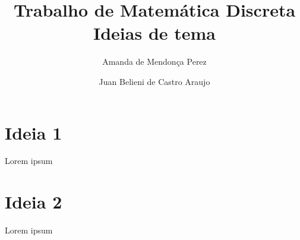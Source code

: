 \documentclass{article}
\title{Trabalho de Matemática Discreta\\
\Large{Ideias de tema}}
\author{Amanda de Mendonça Perez\\
	 \and Juan Belieni de Castro Araujo}
\date{}
\begin{document}
	
	\maketitle
	
	
	\section{Ideia 1}
	
	Lorem ipsum
	
	\section{Ideia 2}
	
	Lorem ipsum
	
\end{document}
